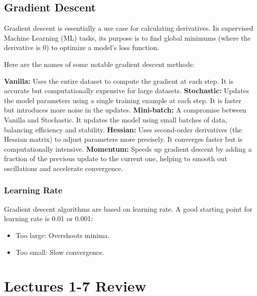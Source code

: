 \subsection{Gradient Descent}
Gradient descent is essentially a use case for calculating derivatives. In supervised Machine Learning (ML) tasks, its purpose is to find global minimums (where the derivative is 0) to optimize a model's loss function. 


Here are the names of some notable gradient descent methods:
\begin{outline}
    \1 \textbf{Vanilla:} Uses the entire dataset to compute the gradient at each step. It is accurate but computationally expensive for large datasets.
    \1 \textbf{Stochastic:} Updates the model parameters using a single training example at each step. It is faster but introduces more noise in the updates.
    \1 \textbf{Mini-batch:} A compromise between Vanilla and Stochastic. It updates the model using small batches of data, balancing efficiency and stability.
    \1 \textbf{Hessian:} Uses second-order derivatives (the Hessian matrix) to adjust parameters more precisely. It converges faster but is computationally intensive.
    \1 \textbf{Momentum:} Speeds up gradient descent by adding a fraction of the previous update to the current one, helping to smooth out oscillations and accelerate convergence.
\end{outline}
\subsubsection{Learning Rate}
Gradient descent algorithms are based on learning rate. A good starting point for learning rate is 0.01 or 0.001:
\begin{itemize}
    \item Too large: Overshoots minima.
    \item Too small: Slow convergence.
\end{itemize}
\section{Lectures 1-7 Review}

